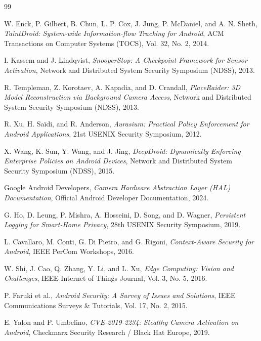 \documentclass[12pt,a4paper]{report}
\begin{document}
\begin{enumerate}
\begin{itemize}
    \clearpage
    \begin{thebibliography}{99}

    W. Enck, P. Gilbert, B. Chun, L. P. Cox, J. Jung, P. McDaniel, and A. N. Sheth,
    \textit{TaintDroid: System-wide Information-flow Tracking for Android},
    ACM Transactions on Computer Systems (TOCS), Vol. 32, No. 2, 2014.

    I. Kassem and J. Lindqvist,
    \textit{SnooperStop: A Checkpoint Framework for Sensor Activation},
    Network and Distributed System Security Symposium (NDSS), 2013.

    R. Templeman, Z. Korotaev, A. Kapadia, and D. Crandall,
    \textit{PlaceRaider: 3D Model Reconstruction via Background Camera Access},
    Network and Distributed System Security Symposium (NDSS), 2013.

    R. Xu, H. Sa\"{i}di, and R. Anderson,
    \textit{Aurasium: Practical Policy Enforcement for Android Applications},
    21st USENIX Security Symposium, 2012.

    X. Wang, K. Sun, Y. Wang, and J. Jing,
    \textit{DeepDroid: Dynamically Enforcing Enterprise Policies on Android Devices},
    Network and Distributed System Security Symposium (NDSS), 2015.

    Google Android Developers,
    \textit{Camera Hardware Abstraction Layer (HAL) Documentation},
    Official Android Developer Documentation, 2024.

    G. Ho, D. Leung, P. Mishra, A. Hosseini, D. Song, and D. Wagner,
    \textit{Persistent Logging for Smart-Home Privacy},
    28th USENIX Security Symposium, 2019.

    L. Cavallaro, M. Conti, G. Di Pietro, and G. Rigoni,
    \textit{Context-Aware Security for Android},
    IEEE PerCom Workshops, 2016.

    W. Shi, J. Cao, Q. Zhang, Y. Li, and L. Xu,
    \textit{Edge Computing: Vision and Challenges},
    IEEE Internet of Things Journal, Vol. 3, No. 5, 2016.

    P. Faruki et al.,
    \textit{Android Security: A Survey of Issues and Solutions},
    IEEE Communications Surveys \& Tutorials, Vol. 17, No. 2, 2015.

    E. Yalon and P. Umbelino,
    \textit{CVE-2019-2234: Stealthy Camera Activation on Android},
    Checkmarx Security Research / Black Hat Europe, 2019.


\end{thebibliography}
\end{itemize}
\end{enumerate}
\end{document}
